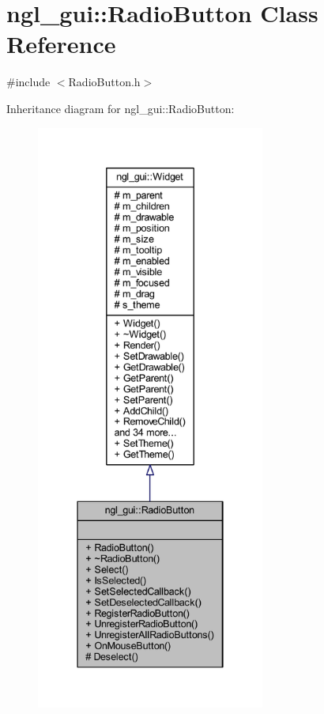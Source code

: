 \hypertarget{classngl__gui_1_1_radio_button}{}\section{ngl\+\_\+gui\+:\+:Radio\+Button Class Reference}
\label{classngl__gui_1_1_radio_button}


{\ttfamily \#include $<$Radio\+Button.\+h$>$}



Inheritance diagram for ngl\+\_\+gui\+:\+:Radio\+Button\+:\nopagebreak
\begin{figure}[H]
\begin{center}
\leavevmode
\includegraphics[height=550pt]{classngl__gui_1_1_radio_button__inherit__graph}
\end{center}
\end{figure}


